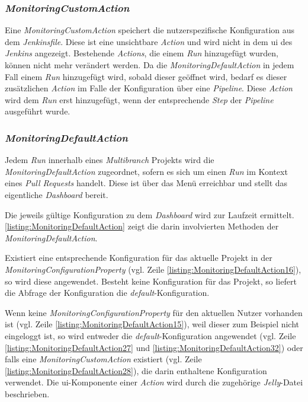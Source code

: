 \subsubsection{\textit{MonitoringCustomAction}}
Eine \textit{MonitoringCustomAction} speichert die nutzerspezifische Konfiguration aus dem \textit{Jenkinsfile}. Diese ist eine unsichtbare \textit{Action} und wird nicht in dem \ac{ui} des \textit{Jenkins} angezeigt. 
Bestehende \textit{Actions}, die einem \textit{Run} hinzugefügt wurden, können nicht mehr verändert werden. Da die \textit{MonitoringDefaultAction} in jedem Fall einem \textit{Run} hinzugefügt wird, sobald dieser geöffnet wird, bedarf es dieser zusätzlichen \textit{Action} im Falle der Konfiguration über eine \textit{Pipeline}. Diese \textit{Action} wird dem \textit{Run} erst hinzugefügt, wenn der entsprechende \textit{Step} der \textit{Pipeline} ausgeführt wurde. 

\subsubsection{\textit{MonitoringDefaultAction}}
\label{chap:MonitoringDefaultAction}
Jedem \textit{Run} innerhalb eines \textit{Multibranch} Projekts wird die \textit{MonitoringDefaultAction} zugeordnet, sofern es sich um einen \textit{Run} im Kontext eines \textit{Pull Requests} handelt. Diese ist über das Menü erreichbar und stellt das eigentliche \textit{Dashboard} bereit. 

Die jeweils gültige Konfiguration zu dem \textit{Dashboard} wird zur Laufzeit ermittelt. \autoref{listing:MonitoringDefaultAction} zeigt die darin involvierten Methoden der \textit{MonitoringDefaultAction}.



Existiert eine entsprechende Konfiguration für das aktuelle Projekt in der \textit{MonitoringConfigurationProperty} (vgl. Zeile \autoref{listing:MonitoringDefaultAction16}), so wird diese angewendet. Besteht keine Konfiguration für das Projekt, so liefert die Abfrage der Konfiguration die \textit{default}-Konfiguration. 

Wenn keine \textit{MonitoringConfigurationProperty} für den aktuellen Nutzer vorhanden ist (vgl. Zeile \autoref{listing:MonitoringDefaultAction15}), weil dieser zum Beispiel nicht eingeloggt ist, so wird entweder die \textit{default}-Konfiguration angewendet (vgl. Zeile \autoref{listing:MonitoringDefaultAction27} und \autoref{listing:MonitoringDefaultAction32}) oder falls eine \textit{MonitoringCustomAction} existiert (vgl. Zeile \autoref{listing:MonitoringDefaultAction28}), die darin enthaltene Konfiguration verwendet. Die \ac{ui}-Komponente einer \textit{Action} wird durch die zugehörige \textit{Jelly}-Datei beschrieben.

